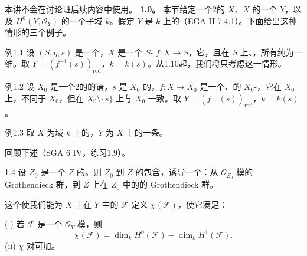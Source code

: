 本讲不会在讨论班后续内容中使用。
\textbf{1.0。} 本节给定一个2的 $X$、$X$ 的一个 $Y$，以及 $H^0(Y,\mathcal O_Y)$ 的一个子域 $k$。假定 $Y$ 是 $k$ 上的（EGA II 7.4.1）。下面给出这种情形的三个例子。
\begin{SGAresult}{例}{1.1}
设 $(S,\eta,s)$ 是一个，$X$ 是一个 $S$- $f:X\to S$，它，且在 $S$ 上、，所有纯为一维。取 $Y=(f^{-1}(s))_{\mathrm{red}}$，$k=k(s)$。从1.10起，我们将只考虑这一情形。
\end{SGAresult}
\begin{SGAresult}{例}{1.2}
设 $X_0$ 是一个2的的谱，$s$ 是 $X_0$ 的，$f:X\to X_0$ 是一个、的 $X_0$-，它在 $X_0$ 上，不同于 $X_0$，但在 $X_0\setminus\{s\}$ 上与 $X_0$ 一致。取 $Y=(f^{-1}(s))_{\mathrm{red}}$，$k=k(s)$。
\end{SGAresult}
\begin{SGAresult}{例}{1.3}
取 $X$ 为域 $k$ 上的，$Y$ 为 $X$ 上的一条。
\end{SGAresult}
回顾下述（SGA 6 IV，练习1.9）。
\begin{SGAresult}{}{1.4}
设 $Z_0$ 是一个 $Z$ 的。则 $Z_0$ 到 $Z$ 的包含，诱导一个：从 $\mathcal O_{Z_0}$-模的 Grothendieck 群，到 $Z$ 上在 $Z_0$ 中的的 Grothendieck 群。
\end{SGAresult}
这个使我们能为 $X$ 上在 $Y$ 中的 $\mathcal F$ 定义  $\chi(\mathcal F)$，使它满足：

(i) 若 $\mathcal F$ 是一个 $\mathcal O_Y$-模，则
\begin{equation}\chi(\mathcal F)=\dim_k H^0(\mathcal F)-\dim_k H^1(\mathcal F).\tag{1.4.1}\end{equation}
(ii) $\chi$ 对可加。

